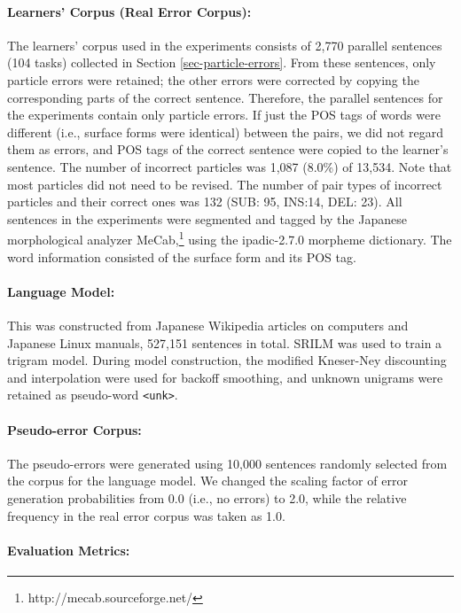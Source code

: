 \documentclass[english]{jnlp_1.4_rep}
\begin{document}
\paragraph{Learners' Corpus (Real Error Corpus): }

The learners' corpus used in the experiments consists of 2,770
parallel sentences (104 tasks) collected in Section
\ref{sec-particle-errors}. From these sentences, only particle errors
were retained; the other errors were corrected by copying the
corresponding parts of the correct sentence. Therefore, the parallel
sentences for the experiments contain only particle errors. If just
the POS tags of words were different (i.e., surface forms were
identical) between the pairs, we did not regard them as errors, and
POS tags of the correct sentence were copied to the learner's
sentence. The number of incorrect particles was 1,087 (8.0\%) of
13,534. Note that most particles did not need to be revised. The
number of pair types of incorrect particles and their correct ones was
132 (SUB: 95, INS:14, DEL: 23). All sentences in the experiments were
segmented and tagged by the Japanese morphological analyzer
MeCab,\footnote{http://mecab.sourceforge.net/} using the ipadic-2.7.0
morpheme dictionary. The word information consisted of the surface
form and its POS tag.


\paragraph{Language Model: }

This was constructed from Japanese Wikipedia articles on computers and
Japanese Linux manuals, 527,151 sentences in total. SRILM
\cite{Stolcke:SRILM2011} was used to train a trigram
model. During model construction, the modified Kneser-Ney
discounting and interpolation were used for backoff smoothing, and
unknown unigrams were retained as pseudo-word \texttt{<unk>}.


\paragraph{Pseudo-error Corpus: }

The pseudo-errors were generated using 10,000 sentences randomly
selected from the corpus for the language model. We changed the
scaling factor of error generation probabilities from 0.0 (i.e., no
errors) to 2.0, while the relative frequency in the real error corpus
was taken as 1.0.


\paragraph{Evaluation Metrics: }
\end{document}
